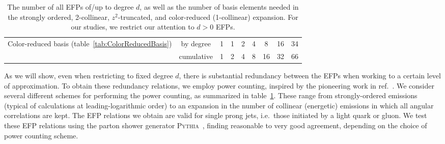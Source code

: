 \documentclass[a4paper,11pt]{article}
\newcommand{\tab}[1]{table~\ref{tab:#1}}
\newcommand{\refcite}[1]{ref.~\cite{#1}}
\newcommand{\Pythia}{\textsc{Pythia}\xspace}
\begin{document}
\begin{table}[t]
\begin{tabular}{|cc||c|c|c|c|c|c|c|}
\multicolumn{1}{|c|}{\multirow{2}{*}{Color-reduced basis (\tab{ColorReducedBasis})}} & by degree      & 1 &   1&   2&  4 & 8  & 16  & 34  \\ \cline{2-9} 
\multicolumn{1}{|c|}{}                                                             & cumulative     & 1 &   2 &  4 & 8  & 16  & 32  & 66  \\ \hline 


\end{tabular}
\caption{The number of all EFPs of/up to degree $d$, as well as the number of basis elements needed in the strongly ordered, 2-collinear, $z^2$-truncated, and color-reduced (1-collinear) expansion.
%
For our studies, we restrict our attention to $d > 0$ EFPs.}
\label{tab:counting}
\end{table}


As we will show, even when restricting to fixed degree $d$, there is substantial redundancy between the EFPs when 
working to a certain level of approximation.
%
To obtain these redundancy relations, we employ power counting, inspired by the pioneering work in \refcite{Larkoski:2014gra}.
%
We consider several different schemes for performing the power counting, as summarized in \tab{counting}.
%
These range from strongly-ordered emissions (typical of  calculations at leading-logarithmic order) to an expansion in the number of collinear (energetic) emissions in which all angular correlations are kept.
%
The EFP relations we obtain are valid for single prong jets, i.e.~those initiated by a light quark or gluon.
%
We test these EFP relations using the parton shower generator \Pythia~\cite{Sjostrand:2014zea}, finding reasonable to very good agreement, depending on the choice of power counting scheme.
\end{document}
